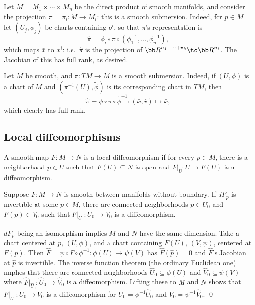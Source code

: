 \bexam

    Let $M=M_1\times\cdots\times M_n$ be the direct product of smooth manifolds, and consider the projection
    $\pi=\pi_i\colon M\to M_i$: this is a smooth submersion.
    Indeed, for $p\in M$ let $(U_j,\phi_j)$ be charts containing $p^i$, so that $\pi$'s representation is
    $$ \hat\pi = \phi_i\circ\pi\circ(\phi_1^{-1},\dots,\phi_n^{-1}) , $$
    which maps $\bar x$ to $x^i$: i.e.\ $\hat\pi$ is the projection of $\bR^{n_1+\cdots+n_k}\to\bR^{n_i}$.
    The Jacobian of this has full rank, as desired.

\eexam

\bexam

    Let $M$ be smooth, and $\pi\colon TM\to M$ is a smooth submersion.
    Indeed, if $(U,\phi)$ is a chart of $M$ and $(\pi^{-1}(U),\tilde\phi)$ is its corresponding chart in $TM$, then
    $$ \hat\pi = \phi\circ\pi\circ\tilde\phi^{-1}\colon (\bar x,\bar v) \mapsto \bar x , $$
    which clearly has full rank.

\eexam

\subsection{Local diffeomorphisms}

\bdefn

    A smooth map $F\colon M\to N$ is a {\emphcolor local diffeomorphism} if for every $p\in M$, there is a neighborhood
    $p\in U$ such that $F(U)\subseteq N$ is open and $F|_U\colon U\to F(U)$ is a diffeomorphism.

\edefn

\bthrm

    Suppose $F\colon M\to N$ is smooth between manifolds without boundary.
    If $dF_p$ is invertible at some $p\in M$, there are connected neighborhoods $p\in U_0$ and $F(p)\in V_0$ such that
    $F|_{U_0}\colon U_0\to V_0$ is a diffeomorphism.

\ethrm

\bproof

    $dF_p$ being an isomorphism implies $M$ and $N$ have the same dimension.
    Take a chart centered at $p$, $(U,\phi)$, and a chart containing $F(U)$, $(V,\psi)$, centered at $F(p)$.
    Then $\hat F=\psi\circ F\circ\phi^{-1}\colon\phi(U)\to\psi(V)$ has $\hat F(\hat p)=0$ and $\hat F$'s Jacobian
    at $\hat p$ is invertible.
    The inverse function theorem (the ordinary Euclidean one) implies that there are connected neighborhoods
    $\hat U_0\subseteq\phi(U)$ and $\hat V_0\subseteq\psi(V)$ where $\hat F|_{\hat U_0}\colon\hat U_0\to\hat V_0$ is
    a diffeomorphism.
    Lifting these to $M$ and $N$ shows that $F|_{U_0}\colon U_0\to V_0$ is a diffeomorphism for $U_0=\phi^{-1}\hat U_0$
    and $V_0=\psi^{-1}\hat V_0$.
    \qed

